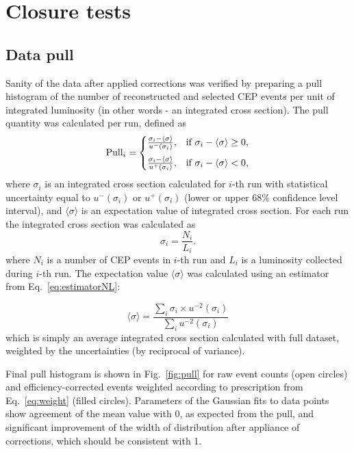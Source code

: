 \section{Closure tests}\label{sec:closureTests}
\subsection{Data pull}

Sanity of the data after applied corrections was verified by preparing a pull histogram of the number of reconstructed and selected CEP events per unit of integrated luminosity (in other words - an integrated cross section). The pull quantity was calculated per run, defined as 
\begin{equation}\label{eq:pull}
  \text{Pull}_{i}=\left\{
  \begin{array}{@{}ll@{}}
    \frac{\sigma_{i}-\langle \sigma\rangle}{u^{-}(\sigma_{i})}, & \text{if}\ \sigma_{i}-\langle \sigma\rangle \geq 0, \\[8pt]
    \frac{\sigma_{i}-\langle \sigma\rangle}{u^{+}(\sigma_{i})}, & \text{if}\ \sigma_{i}-\langle \sigma\rangle < 0,
  \end{array}\right.
\end{equation}
where $\sigma_{i}$ is an integrated cross section calculated for $i$-th run with statistical uncertainty equal to $u^{-}(\sigma_{i})$ or $u^{+}(\sigma_{i})$ (lower or upper 68\% confidence level interval), and $\langle \sigma\rangle$ is an expectation value of integrated cross section. For each run the integrated cross section was calculated as
\begin{equation}\label{eq:crossSecPull}
 \sigma_{i} = \frac{N_{i}}{L_{i}}.
\end{equation}
where $N_{i}$ is a number of CEP events in $i$-th run and $L_{i}$ is a luminosity collected during $i$-th run. The expectation value $\langle \sigma\rangle$ was calculated using an estimator from Eq.~\eqref{eq:estimatorNL}:

\begin{equation}\label{eq:estimatorNL}
 \langle \sigma\rangle = \frac{\sum\limits_{i}\sigma_{i} \times u^{-2}(\sigma_{i})}{\sum\limits_{i}u^{-2}(\sigma_{i})}
\end{equation}
which is simply an average integrated cross section calculated with full dataset, weighted by the uncertainties (by reciprocal of variance).

Final pull histogram is shown in Fig.~\ref{fig:pull} for raw event counts (open circles) and efficiency-corrected events weighted according to prescription from Eq.~\eqref{eq:weight} (filled circles). Parameters of the Gaussian fits to data points show agreement of the mean value with 0, as expected from the pull, and significant improvement of the width of distribution after appliance of corrections, which should be consistent with 1.


